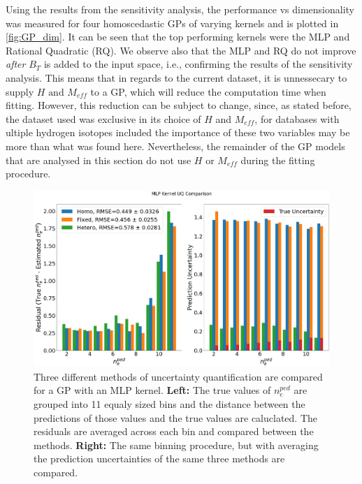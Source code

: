 \documentclass[a4paper, twoside, final, 12pt]{article}
\begin{document}
{Using the results from the sensitivity analysis, the performance vs dimensionality was measured for four homoscedastic GPs of varying kernels and is plotted in \ref{fig:GP_dim}. It can be seen that the top performing kernels were the MLP and Rational Quadratic (RQ). We observe also that the MLP and RQ do not improve \textit{after} $B_T$ is added to the input space, i.e., confirming the results of the sensitivity analysis. This means that in regards to the current dataset, it is unnessecary to supply $H \text{ and } M_{eff}$ to a GP, which will reduce the computation time when fitting. However, this reduction can be subject to change, since, as stated before, the dataset used was exclusive in its choice of $H$ and $M_{eff}$, for databases with ultiple hydrogen isotopes included the importance of these two variables may be more than what was found here. Nevertheless, the remainder of the GP models that are analysed in this section do not use $H$ or $M_{eff}$ during the fitting procedure. 

\begin{figure}[H]\centering
		\includegraphics[scale=0.25]{./src/MLP_uq_compare}
		\caption{Three different methods of uncertainty quantification are compared for a GP with an MLP kernel. \textbf{Left:} The true values of $n_e^{ped}$ are grouped into 11 equaly sized bins and the distance between the predictions of those values and the true values are caluclated. The residuals are averaged across each bin and compared between the methods. \textbf{Right:} The same binning procedure, but with averaging the prediction uncertainties of the same three methods are compared.}
	\label{fig:MLP_UQ}
\end{figure}

}
\end{document}
